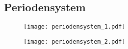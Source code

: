 \begin{appendices}
        \clearpage
        \chapter{Periodensystem}
        
        \begin{figure}\label{fig:persys}
                \centering
                \texttt{[image: periodensystem\_1.pdf]}
        \end{figure}        

        \begin{figure}
                \centering
                \texttt{[image: periodensystem\_2.pdf]}
        \end{figure}

\end{appendices}